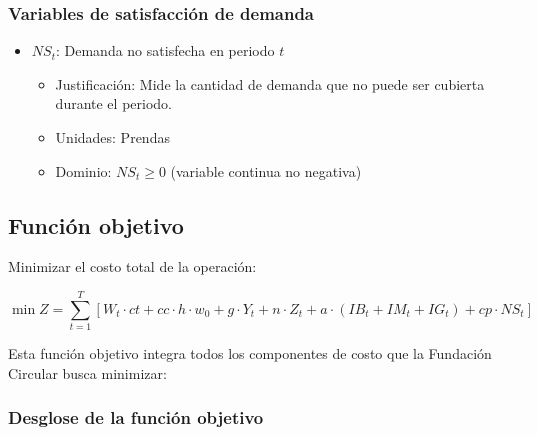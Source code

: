 \subsubsection*{Variables de satisfacción de demanda}

\begin{itemize}
    \item $NS_{t}$: Demanda no satisfecha en periodo $t$
    \begin{itemize}
        \item Justificación: Mide la cantidad de demanda que no puede ser cubierta durante el periodo.
        \item Unidades: Prendas
        \item Dominio: $NS_t \geq 0$ (variable continua no negativa)
    \end{itemize}
\end{itemize}

\subsection*{Función objetivo}

Minimizar el costo total de la operación:

\begin{equation}
\min Z = \sum_{t=1}^{T} \left[ W_t \cdot ct + cc \cdot h \cdot w_0 + g \cdot Y_t + n \cdot Z_t + a \cdot (IB_t + IM_t + IG_t) + cp \cdot NS_t \right]
\end{equation}

Esta función objetivo integra todos los componentes de costo que la Fundación Circular busca minimizar:

\subsubsection*{Desglose de la función objetivo}

